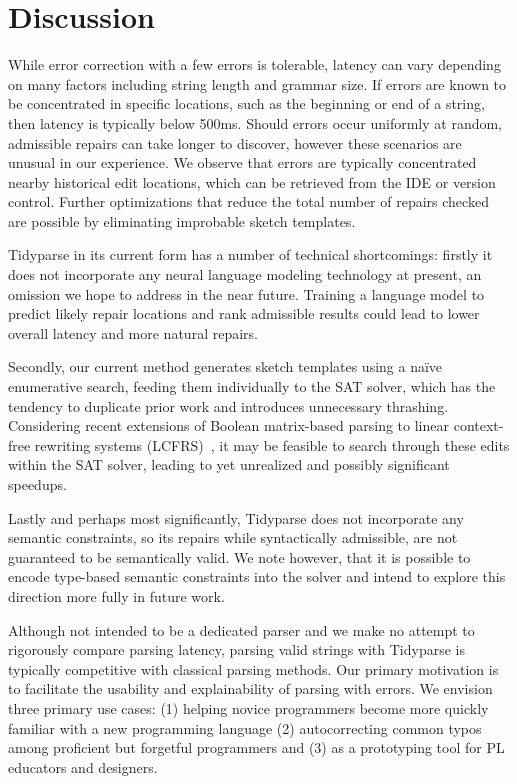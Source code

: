 \documentclass[sigplan,review,anonymous,acmsmall]{acmart}\settopmatter{printfolios=false,printccs=false,printacmref=false}
\begin{document}
\section{Discussion}

While error correction with a few errors is tolerable, latency can vary depending on many factors including string length and grammar size. If errors are known to be concentrated in specific locations, such as the beginning or end of a string, then latency is typically below 500ms. Should errors occur uniformly at random, admissible repairs can take longer to discover, however these scenarios are unusual in our experience. We observe that errors are typically concentrated nearby historical edit locations, which can be retrieved from the IDE or version control. Further optimizations that reduce the total number of repairs checked are possible by eliminating improbable sketch templates.

Tidyparse in its current form has a number of technical shortcomings: firstly it does not incorporate any neural language modeling technology at present, an omission we hope to address in the near future. Training a language model to predict likely repair locations and rank admissible results could lead to lower overall latency and more natural repairs.

Secondly, our current method generates sketch templates using a na\"ive enumerative search, feeding them individually to the SAT solver, which has the tendency to duplicate prior work and introduces unnecessary thrashing. Considering recent extensions of Boolean matrix-based parsing to linear context-free rewriting systems (LCFRS)~\cite{cohen2016parsing}, it may be feasible to search through these edits within the SAT solver, leading to yet unrealized and possibly significant speedups.

Lastly and perhaps most significantly, Tidyparse does not incorporate any semantic constraints, so its repairs while syntactically admissible, are not guaranteed to be semantically valid. We note however, that it is possible to encode type-based semantic constraints into the solver and intend to explore this direction more fully in future work.

Although not intended to be a dedicated parser and we make no attempt to rigorously compare parsing latency, parsing valid strings with Tidyparse is typically competitive with classical parsing methods. Our primary motivation is to facilitate the usability and explainability of parsing with errors. We envision three primary use cases: (1) helping novice programmers become more quickly familiar with a new programming language (2) autocorrecting common typos among proficient but forgetful programmers and (3) as a prototyping tool for PL educators and designers.
\end{document}
